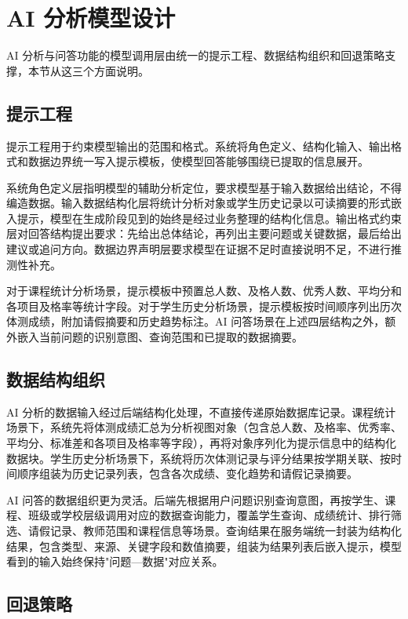 \section{AI 分析模型设计}

AI 分析与问答功能的模型调用层由统一的提示工程、数据结构组织和回退策略支撑，本节从这三个方面说明。

\subsection{提示工程}

提示工程用于约束模型输出的范围和格式。系统将角色定义、结构化输入、输出格式和数据边界统一写入提示模板，使模型回答能够围绕已提取的信息展开。

系统角色定义层指明模型的辅助分析定位，要求模型基于输入数据给出结论，不得编造数据。输入数据结构化层将统计分析对象或学生历史记录以可读摘要的形式嵌入提示，模型在生成阶段见到的始终是经过业务整理的结构化信息。输出格式约束层对回答结构提出要求：先给出总体结论，再列出主要问题或关键数据，最后给出建议或追问方向。数据边界声明层要求模型在证据不足时直接说明不足，不进行推测性补充。

对于课程统计分析场景，提示模板中预置总人数、及格人数、优秀人数、平均分和各项目及格率等统计字段。对于学生历史分析场景，提示模板按时间顺序列出历次体测成绩，附加请假摘要和历史趋势标注。AI 问答场景在上述四层结构之外，额外嵌入当前问题的识别意图、查询范围和已提取的数据摘要。

\subsection{数据结构组织}

AI 分析的数据输入经过后端结构化处理，不直接传递原始数据库记录。课程统计场景下，系统先将体测成绩汇总为分析视图对象（包含总人数、及格率、优秀率、平均分、标准差和各项目及格率等字段），再将对象序列化为提示信息中的结构化数据块。学生历史分析场景下，系统将历次体测记录与评分结果按学期关联、按时间顺序组装为历史记录列表，包含各次成绩、变化趋势和请假记录摘要。

AI 问答的数据组织更为灵活。后端先根据用户问题识别查询意图，再按学生、课程、班级或学校层级调用对应的数据查询能力，覆盖学生查询、成绩统计、排行筛选、请假记录、教师范围和课程信息等场景。查询结果在服务端统一封装为结构化结果，包含类型、来源、关键字段和数值摘要，组装为结果列表后嵌入提示，模型看到的输入始终保持"问题—数据"对应关系。

\subsection{回退策略}


